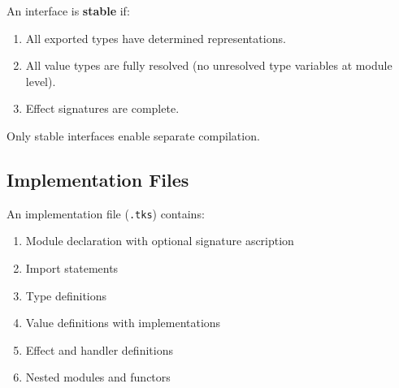 \begin{definition}
\label{def:interface-stability}
An interface is \textbf{stable} if:
\begin{enumerate}
  \item All exported types have determined representations.
  \item All value types are fully resolved (no unresolved type variables at module level).
  \item Effect signatures are complete.
\end{enumerate}
Only stable interfaces enable separate compilation.
\end{definition}

\subsection{Implementation Files}
\label{subsec:implementation-files}

\begin{definition}
\label{def:implementation-content}
An implementation file (\texttt{.tks}) contains:
\begin{enumerate}
  \item Module declaration with optional signature ascription
  \item Import statements
  \item Type definitions
  \item Value definitions with implementations
  \item Effect and handler definitions
  \item Nested modules and functors
\end{enumerate}
\end{definition}

